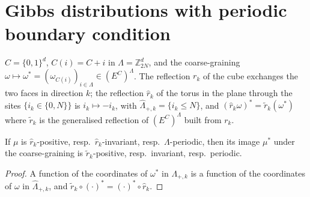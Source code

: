 \section{Gibbs distributions with periodic boundary condition}

\begin{definition}
    \label{def:rp-17-12}
    \leanok

    $C = \{0,1\}^d$, $C(i) = C + i$ in $\Lambda = \mathbb Z_{2N}^d$, and the coarse-graining
    $\omega \mapsto \omega^* = (\omega_{C(i)})_{i \in \Lambda} \in (E^C)^\Lambda$. The reflection
    $r_k$ of the cube exchanges the two faces in direction $k$; the reflection $\hat r_k$ of the
    torus in the plane through the sites $\{i_k \in \{0, N\}\}$ is $i_k \mapsto -i_k$, with
    $\hat\Lambda_{+,k} = \{i_k \leq N\}$, and $(\hat r_k\omega)^* = \tilde r_k(\omega^*)$ where
    $\tilde r_k$ is the generalised reflection of $(E^C)^\Lambda$ built from $r_k$.
\end{definition}

\begin{lemma}[Georgii (17.16)]
    \label{lem:rp-17-16}
    \leanok

    If $\mu$ is $\hat r_k$-positive, resp.\ $\hat r_k$-invariant, resp.\ $\Lambda$-periodic, then
    its image $\mu^*$ under the coarse-graining is $\tilde r_k$-positive, resp.\ invariant, resp.\
    periodic.
\end{lemma}
\begin{proof}
    \leanok
    A function of the coordinates of $\omega^*$ in $\Lambda_{+,k}$ is a function of the
    coordinates of $\omega$ in $\hat\Lambda_{+,k}$, and $\tilde r_k \circ (\cdot)^* = (\cdot)^*
    \circ \hat r_k$.
\end{proof}

